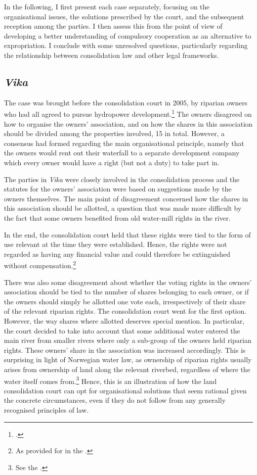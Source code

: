 In the following, I first present each case separately, focusing on the organisational issues, the solutions prescribed by the court, and the subsequent reception among the parties. I then assess this from the point of view of developing a better understanding of compulsory cooperation as an alternative to expropriation. I conclude with some unresolved questions, particularly regarding the relationship between consolidation law and other legal frameworks.

\subsection{\emph{Vika}}

The case was brought before the consolidation court in 2005, by riparian owners who had all agreed to pursue hydropower development.\footcite{vika05} The owners disagreed on how to organise the owners' association, and on how the shares in this association should be divided among the properties involved, 15 in total. However, a consensus had formed regarding the main organisational principle, namely that the owners would rent out their waterfall to a separate development company which every owner would have a right (but not a duty) to take part in. 

The parties in \emph{Vika} were closely involved in the consolidation process and the statutes for the owners' association were based on suggestions made by the owners themselves. The main point of disagreement concerned how the shares in this association should be allotted, a question that was made more difficult by the fact that some owners benefited from old water-mill rights in the river. 

In the end, the consolidation court held that these rights were tied to the form of use relevant at the time they were established. Hence, the rights were not regarded as having any financial value and could therefore be extinguished without compensation.\footnote{As provided for in the \cite[2|36|38]{lca79}.}

There was also some disagreement about whether the voting rights in the owners' association should be tied to the number of shares belonging to each owner, or if the owners should simply be allotted one vote each, irrespectively of their share of the relevant riparian rights. The consolidation court went for the first option. However, the way shares where allotted deserves special mention. In particular, the court decided to take into account that some additional water entered the main river from smaller rivers where only a sub-group of the owners held riparian rights. These owners' share in the association was increased accordingly. This is surprising in light of Norwegian water law, as ownership of riparian rights usually arises from ownership of land along the relevant riverbed, regardless of where the water itself comes from.\footnote{See the \cite[13]{wra00}.} Hence, this is an illustration of how the land consolidation court can opt for organisational solutions that seem rational given the concrete circumstances, even if they do not follow from any generally recognised principles of law. 

